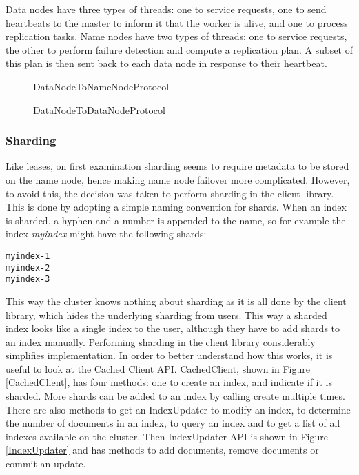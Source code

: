 \documentclass[a4paper,10pt]{article}
\begin{document}
Data nodes have three types of threads: one to service requests, one to send heartbeats to the master to inform it that the worker is alive, and one to process replication tasks. Name nodes have two types of threads: one to service requests, the other to perform failure detection and compute a replication plan. A subset of this plan is then sent back to each data node in response to their heartbeat.

\begin{figure}

\caption{DataNodeToNameNodeProtocol}
\label{DataNodeToNameNodeProtocol}
\end{figure}

\begin{figure}

\caption{DataNodeToDataNodeProtocol}
\label{DataNodeToDataNodeProtocol}
\end{figure}

\subsubsection{Sharding}
Like leases, on first examination sharding seems to require metadata to be stored on the name node, hence making name node failover more complicated. However, to avoid this, the decision was taken to perform sharding in the client library. This is done by adopting a simple naming convention for shards. When an index is sharded, a hyphen and a number is appended to the name, so for example the index \emph{myindex} might have the following shards:

\begin{verbatim}
myindex-1
myindex-2
myindex-3
\end{verbatim}

This way the cluster knows nothing about sharding as it is all done by the client library, which hides the underlying sharding from users. This way a sharded index looks like a single index to the user, although they have to add shards to an index manually. Performing sharding in the client library considerably simplifies implementation. In order to better understand how this works, it is useful to look at the Cached Client API. CachedClient, shown in Figure \ref{CachedClient}, has four methods: one to create an index, and indicate if it is sharded. More shards can be added to an index by calling create multiple times. There are also methods to get an IndexUpdater to modify an index, to determine the number of documents in an index, to query an index and to get a list of all indexes available on the cluster. Then IndexUpdater API is shown in Figure \ref{IndexUpdater} and has methods to add documents, remove documents or commit an update. 
\end{document}
